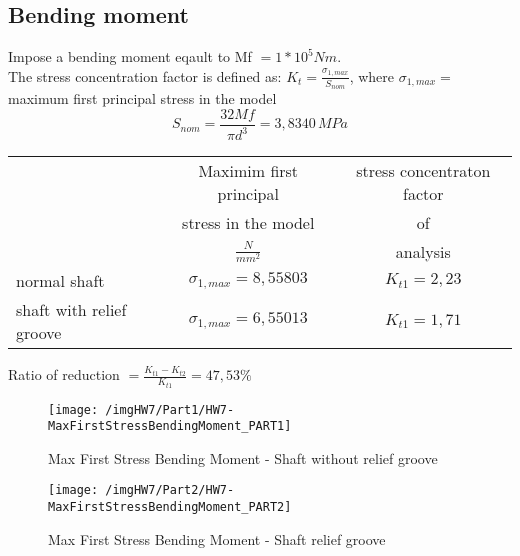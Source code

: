 \subsection{Bending moment}
Impose a bending moment eqault to Mf $= 1 * 10^5 Nm$.\\
The stress concentration factor is defined as: $K_{t} = \frac{ \sigma_{1,max}}{S_{nom}}$, where $\sigma_{1,max}=$ maximum first principal stress in the model\\
\[S_{nom}= \frac{32Mf}{\pi d^3}=3,8340 \, MPa\]
\begin{table}[h]
\centering
\begin{tabular}{lcc}
\hline
& Maximim first principal  & stress concentraton factor\\
& stress in the model & of\\
& $\frac{N}{mm^2}$ &analysis\\
\hline
normal shaft & $\sigma_{1,max}= 8,55803 $ &$K_{t1}= 2,23$\\
shaft with relief groove & $\sigma_{1,max}=6,55013 $ &$K_{t1}=1,71$\\
\hline
\end{tabular}
\end{table}
Ratio of reduction $ = \frac{K_{t1}-K_{t2}}{K_{t1}}= 47,53 \%$
\begin{figure}[!h]
\centering
\texttt{[image: /imgHW7/Part1/HW7-MaxFirstStressBendingMoment\_PART1]}
\caption{Max First Stress Bending Moment - Shaft without relief groove}
\label{img:HW7-MFBM1}
\end{figure}
\begin{figure}
\centering
\texttt{[image: /imgHW7/Part2/HW7-MaxFirstStressBendingMoment\_PART2]}
\caption{Max First Stress Bending Moment - Shaft relief groove}
\label{img:HW7-MFBM2}
\end{figure}\\
\newpage
